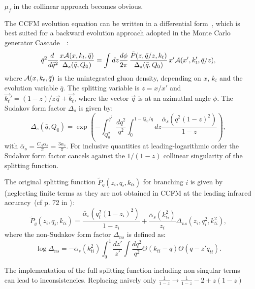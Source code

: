 \documentclass[11pt]{article} \usepackage{mystyle-new}
\newcommand{\cA}{{\cal A}}
\newcommand{\Pmax}{\bar{q}}
\newcommand{\kt}{k_{t}}
\newcommand{\alphasb}{\bar{\alpha}_s}
\def\CASCADE{{\sc Cascade}}
\begin{document}
$\mu_f$ in the collinear approach becomes obvious.
\par
The CCFM evolution equation can be written in a differential form~\cite{CCFMd},
which is best suited for a backward evolution approach adopted in the Monte
Carlo generator \CASCADE\ ~\cite{CASCADE,jung_salam_2000}:
\begin{equation}
\Pmax^2\frac{d\; }{d \Pmax^2} 
   \frac{x \cA(x,\kt,\Pmax)}{\Delta_s(\Pmax,Q_0)}=
   \int dz \frac{d\phi}{2\pi}\,
   \frac{\tilde{P} (z,\Pmax/z,\kt)}{\Delta_s(\Pmax,Q_0)}\,
 x'\cA(x',\kt',\Pmax/z) ,
\label{CCFM_differential}
\end{equation} 
where $\cA(x,\kt,\Pmax)$ is the unintegrated gluon density, depending on 
$x$, $\kt$ and the evolution variable $\Pmax$. The splitting variable is 
$z=x/x'$ and $\vec{\kt}' = (1-z)/z\vec{q} + \vec{\kt}$, where the vector
$\vec{q}$ is at an azimuthal angle $\phi$.
The  Sudakov form factor $\Delta_s$ is given by:
\begin{equation}
\Delta_s(\Pmax,Q_0) =\exp{\left(
 - \int_{Q_0^2} ^{\Pmax^2}
 \frac{d q^{2}}{q^{2}} 
 \int_0^{1-Q_0/q} dz \frac{\alphasb(q^2(1-z)^2)}{1-z}
  \right)} ,
  \label{Sudakov}
\end{equation}
with $\alphasb=\frac{C_A \alpha_s}{\pi}=\frac{3 \alpha_s}{\pi}$. For
inclusive quantities at leading-logarithmic order the Sudakov form
factor cancels against the $1/(1-z)$ collinear singularity of the
splitting function. 
\par
The original splitting function $\tilde{P}_g (z_i,q_i,k_{ti})$ for branching $i$ 
is given by (neglecting finite terms as they
are not obtained in CCFM at the leading infrared
accuracy~(cf p. 72 in \cite{Catani:1989sg}):
\begin{equation}
\tilde{P}_g (z_i,q_i,k_{ti})
= \frac{\alphasb(q^2_{i}(1-z_i)^2)}{1-z_i} + 
\frac{\alphasb(k^2_{ti})}{z_i} \Delta_{ns}(z_i,q^2_{i},k^2_{ti}),
\label{Pgg}
\end{equation}
where the non-Sudakov form factor $\Delta_{ns}$ is defined as:
\begin{equation}
\log\Delta_{ns} =  -\alphasb(k^2_{ti})
                  \int_0^1 \frac{dz'}{z'} 
                        \int \frac{d q^2}{q^2} 
              \Theta(k_{ti}-q)\Theta(q-z'q_{ti}).
                  \label{non_sudakov}                   
\end{equation}
\par
The implementation of the full splitting function including non singular terms can lead to inconsistencies.
Replacing naively only
$  \frac1{1-z} \to \frac{1}{1-z} - 2 + z(1-z)\,$ 
\end{document}
